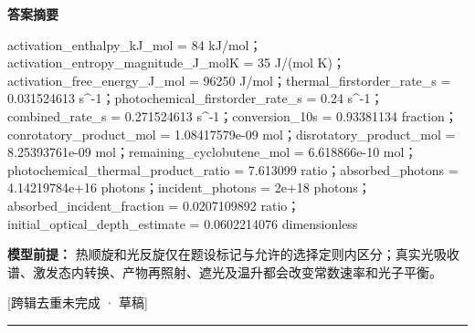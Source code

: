 \documentclass[UTF8,11pt,a4paper]{ctexart}
\begin{document}
\noindent\textbf{答案摘要}\par
activation\_enthalpy\_kJ\_mol = 84 kJ/mol；activation\_entropy\_magnitude\_J\_molK = 35 J/(mol K)；activation\_free\_energy\_J\_mol = 96250 J/mol；thermal\_firstorder\_rate\_s = 0.031524613 s\textasciicircum{}-1；photochemical\_firstorder\_rate\_s = 0.24 s\textasciicircum{}-1；combined\_rate\_s = 0.271524613 s\textasciicircum{}-1；conversion\_10s = 0.93381134 fraction；conrotatory\_product\_mol = 1.08417579e-09 mol；disrotatory\_product\_mol = 8.25393761e-09 mol；remaining\_cyclobutene\_mol = 6.618866e-10 mol；photochemical\_thermal\_product\_ratio = 7.613099 ratio；absorbed\_photons = 4.14219784e+16 photons；incident\_photons = 2e+18 photons；absorbed\_incident\_fraction = 0.0207109892 ratio；initial\_optical\_depth\_estimate = 0.0602214076 dimensionless\par
\noindent\textbf{模型前提：}
热顺旋和光反旋仅在题设标记与允许的选择定则内区分；真实光吸收谱、激发态内转换、产物再照射、遮光及温升都会改变常数速率和光子平衡。\par
\noindent\textcolor{red!65!black}{[跨辑去重未完成 · 草稿]} \par
\medskip\hrule\medskip
{}
\end{document}
